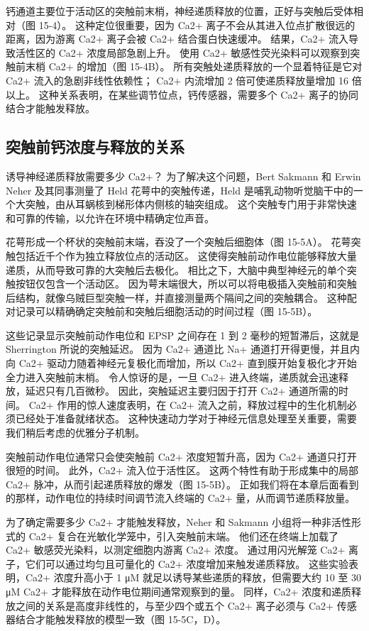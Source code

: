钙通道主要位于活动区的突触前末梢，神经递质释放的位置，正好与突触后受体相对（图 15-4）。 这种定位很重要，因为 Ca2+ 离子不会从其进入位点扩散很远的距离，因为游离 Ca2+ 离子会被 Ca2+ 结合蛋白快速缓冲。 结果，Ca2+ 流入导致活性区的 Ca2+ 浓度局部急剧上升。 使用 Ca2+ 敏感性荧光染料可以观察到突触前末梢 Ca2+ 的增加（图 15-4B）。 所有突触处递质释放的一个显着特征是它对 Ca2+ 流入的急剧非线性依赖性； Ca2+ 内流增加 2 倍可使递质释放量增加 16 倍以上。 这种关系表明，在某些调节位点，钙传感器，需要多个 Ca2+ 离子的协同结合才能触发释放。

\subsection{突触前钙浓度与释放的关系}
诱导神经递质释放需要多少 Ca2+？ 为了解决这个问题，Bert Sakmann 和 Erwin Neher 及其同事测量了 Held 花萼中的突触传递，Held 是哺乳动物听觉脑干中的一个大突触，由从耳蜗核到梯形体内侧核的轴突组成。 这个突触专门用于非常快速和可靠的传输，以允许在环境中精确定位声音。

花萼形成一个杯状的突触前末端，吞没了一个突触后细胞体（图 15-5A）。 花萼突触包括近千个作为独立释放位点的活动区。 这使得突触前动作电位能够释放大量递质，从而导致可靠的大突触后去极化。 相比之下，大脑中典型神经元的单个突触按钮仅包含一个活动区。 因为萼末端很大，所以可以将电极插入突触前和突触后结构，就像乌贼巨型突触一样，并直接测量两个隔间之间的突触耦合。 这种配对记录可以精确确定突触前和突触后细胞活动的时间过程（图 15-5B）。

这些记录显示突触前动作电位和 EPSP 之间存在 1 到 2 毫秒的短暂滞后，这就是 Sherrington 所说的突触延迟。 因为 Ca2+ 通道比 Na+ 通道打开得更慢，并且内向 Ca2+ 驱动力随着神经元复极化而增加，所以 Ca2+ 直到膜开始复极化才开始全力进入突触前末梢。 令人惊讶的是，一旦 Ca2+ 进入终端，递质就会迅速释放，延迟只有几百微秒。 因此，突触延迟主要归因于打开 Ca2+ 通道所需的时间。 Ca2+ 作用的惊人速度表明，在 Ca2+ 流入之前，释放过程中的生化机制必须已经处于准备就绪状态。 这种快速动力学对于神经元信息处理至关重要，需要我们稍后考虑的优雅分子机制。

突触前动作电位通常只会使突触前 Ca2+ 浓度短暂升高，因为 Ca2+ 通道只打开很短的时间。 此外，Ca2+ 流入位于活性区。 这两个特性有助于形成集中的局部 Ca2+ 脉冲，从而引起递质释放的爆发（图 15-5B）。 正如我们将在本章后面看到的那样，动作电位的持续时间调节流入终端的 Ca2+ 量，从而调节递质释放量。

为了确定需要多少 Ca2+ 才能触发释放，Neher 和 Sakmann 小组将一种非活性形式的 Ca2+ 复合在光敏化学笼中，引入突触前末端。 他们还在终端上加载了 Ca2+ 敏感荧光染料，以测定细胞内游离 Ca2+ 浓度。 通过用闪光解笼 Ca2+ 离子，它们可以通过均匀且可量化的 Ca2+ 浓度增加来触发递质释放。 这些实验表明，Ca2+ 浓度升高小于 1 μM 就足以诱导某些递质的释放，但需要大约 10 至 30 μM Ca2+ 才能释放在动作电位期间通常观察到的量。 同样，Ca2+ 浓度和递质释放之间的关系是高度非线性的，与至少四个或五个 Ca2+ 离子必须与 Ca2+ 传感器结合才能触发释放的模型一致（图 15-5C，D）。

